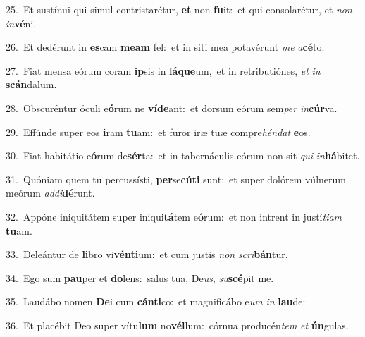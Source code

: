 {\numbfont\textcolor{\numbcolor}{25.}}~Et sustínui qui simul contristarétur, \textbf{et} non \textbf{fu}\-it:~\star et qui consolarétur, et \textit{non} \textit{in}\-\textbf{vé}ni.\par
{\numbfont\textcolor{\numbcolor}{26.}}~Et dedérunt in \textbf{es}\-cam \textbf{me}\-\textbf{am} fel:~\star et in siti mea potavérunt \textit{me} \textit{a}\-\textbf{cé}to.\par
{\numbfont\textcolor{\numbcolor}{27.}}~Fiat mensa eórum coram \textbf{ip}\-sis in \textbf{lá}\-\textbf{que}um,~\star et in retributiónes, \textit{et} \textit{in} \textbf{scán}\-dalum.\par
{\numbfont\textcolor{\numbcolor}{28.}}~Obscuréntur óculi e\-\textbf{ó}\-rum ne \textbf{ví}\-\textbf{de}ant:~\star et dorsum eórum sem\textit{per} \textit{in}\-\textbf{cúr}va.\par
{\numbfont\textcolor{\numbcolor}{29.}}~Effúnde super eos \textbf{i}\-ram \textbf{tu}\-am:~\star et furor iræ tuæ compre\-\textit{hén}\-\textit{dat} \textbf{e}\-os.\par
{\numbfont\textcolor{\numbcolor}{30.}}~Fiat habitátio e\-\textbf{ó}\-rum de\-\textbf{sér}\-ta:~\star et in tabernáculis eórum non sit \textit{qui} \textit{in}\-\textbf{há}bitet.\par
{\numbfont\textcolor{\numbcolor}{31.}}~Quóniam quem tu percussísti, \textbf{per}\-se\-\textbf{cú}\-\textbf{ti} sunt:~\star et super dolórem vúlnerum meórum \textit{ad}\-\textit{di}\textbf{dé}runt.\par
{\numbfont\textcolor{\numbcolor}{32.}}~Appóne iniquitátem super iniqui\-\textbf{tá}\-tem e\-\textbf{ó}\-rum:~\star et non intrent in justí\-\textit{ti}\-\textit{am} \textbf{tu}\-am.\par
{\numbfont\textcolor{\numbcolor}{33.}}~Deleántur de \textbf{li}\-bro vi\-\textbf{vén}\-\textbf{ti}um:~\star et cum justis \textit{non} \textit{scri}\-\textbf{bán}tur.\par
{\numbfont\textcolor{\numbcolor}{34.}}~Ego sum \textbf{pau}\-per et \textbf{do}\-lens:~\star salus tua, De\-\textit{us}\-, \textit{su}\-\textbf{scé}pit me.\par
{\numbfont\textcolor{\numbcolor}{35.}}~Laudábo nomen \textbf{De}\-i cum \textbf{cán}\-\textbf{ti}co:~\star et magnificábo e\textit{um} \textit{in} \textbf{lau}\-de:\par
{\numbfont\textcolor{\numbcolor}{36.}}~Et placébit Deo super vítu\textbf{lum} no\-\textbf{vél}\-lum:~\star córnua producén\textit{tem} \textit{et} \textbf{ún}\-gulas.\par
